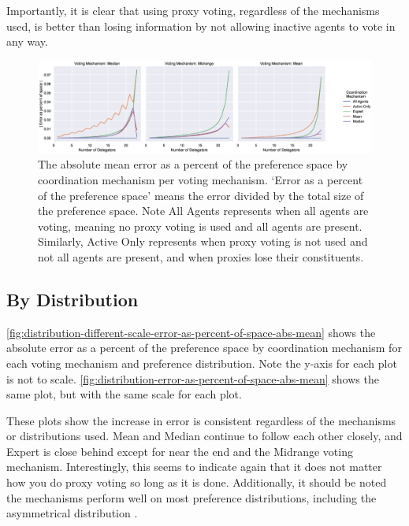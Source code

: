 Importantly, it is clear that using proxy voting, regardless of the mechanisms used,
is better than losing information by not allowing inactive agents to vote in any way.

\begin{landscape}
    \begin{figure}[p]
        \centering
        \includegraphics[scale=0.55]
        {content/chapter2/figures/vm_col_cm_hue_error_as_percent_of_space_abs_mean}
        \caption{
            The absolute mean error as a percent of the preference space by
            coordination mechanism per voting mechanism.
            `Error as a percent of the preference space' means the error divided by
            the total size of the preference space.
            Note All Agents represents when all agents are voting, meaning no proxy
            voting is used and all agents are present.
            Similarly, Active Only represents when proxy voting is not used and not
            all agents are present, and when proxies lose their constituents.
        }
        \label{fig:vm-col-cm-hue-error-as-percent-of-space-abs-mean}
    \end{figure}
\end{landscape}

\subsection{By Distribution}\label{subsec:results-distribution}
\autoref{fig:distribution-different-scale-error-as-percent-of-space-abs-mean} shows
the absolute error as a percent of the preference space by coordination mechanism for
each voting mechanism and preference distribution.
Note the y-axis for each plot is not to scale.
\autoref{fig:distribution-error-as-percent-of-space-abs-mean} shows the same plot,
but with the same scale for each plot.

These plots show the increase in error is consistent regardless of the mechanisms or
distributions used.
Mean and Median continue to follow each other closely, and Expert is close behind
except for near the end and the Midrange voting mechanism.
Interestingly, this seems to indicate again that it does not matter how you do proxy
voting so long as it is done.
Additionally, it should be noted the mechanisms perform well on most preference
distributions, including the asymmetrical distribution .

